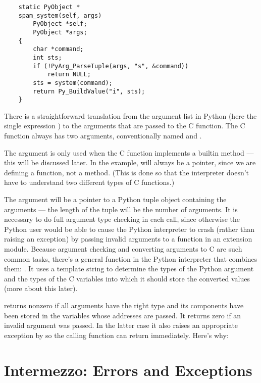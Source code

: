 \begin{verbatim}
    static PyObject *
    spam_system(self, args)
        PyObject *self;
        PyObject *args;
    {
        char *command;
        int sts;
        if (!PyArg_ParseTuple(args, "s", &command))
            return NULL;
        sts = system(command);
        return Py_BuildValue("i", sts);
    }
\end{verbatim}

There is a straightforward translation from the argument list in
Python (here the single expression ) to the arguments
that are passed to the C function.  The C function always has two
arguments, conventionally named  and .

The  argument is only used when the C function implements a
builtin method --- this will be discussed later. In the example,
 will always be a  pointer, since we are defining
a function, not a method.  (This is done so that the interpreter
doesn't have to understand two different types of C functions.)

The  argument will be a pointer to a Python tuple object
containing the arguments --- the length of the tuple will be the
number of arguments.  It is necessary to do full argument type
checking in each call, since otherwise the Python user would be able
to cause the Python interpreter to crash (rather than raising an
exception) by passing invalid arguments to a function in an extension
module.  Because argument checking and converting arguments to C are
such common tasks, there's a general function in the Python
interpreter that combines them: .  It uses a
template string to determine the types of the Python argument and the
types of the C variables into which it should store the converted
values (more about this later).

 returns nonzero if all arguments have the
right type and its components have been stored in the variables whose
addresses are passed.  It returns zero if an invalid argument was
passed.  In the latter case it also raises an appropriate exception by
so the calling function can return  immediately.  Here's
why:


\section{Intermezzo: Errors and Exceptions}

